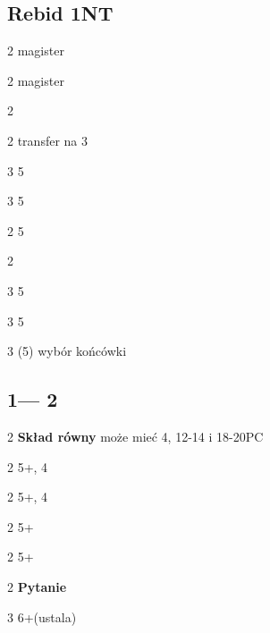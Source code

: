 \documentclass[12pt, a4paper]{article}
\begin{document}
\subsection*{Rebid 1NT}
\begin{options}[2]
    \item[2\clubs] magister
    \item[2\diams] magister
    \item[2\hearts] \soff
    \item[2\nt] transfer na 3\clubs \vimp
    \item[3\clubs] 5\clubs\ \gf \imp
    \item[3\diams] 5\diams\ \gf \imp
\end{options}

\begin{options}[2]
    \item[2\hearts] 5\hearts\ \inv
    \item[2\nt] \bal\ \inv 
    \item[3\clubs] 5\clubs\ \inv
    \item[3\diams] 5\diams\ \inv
    \item[3\nt] (5) wybór końcówki \vimp
\end{options}

\pagebreak
\subsection*{1\clubs --- 2\clubs}
\sequence{{1\clubs}{2\clubs}}
\begin{options}[1]
    \item[2\diams] \textbf{Skład równy} może mieć 4\major, 12-14 i 18-20PC \vimp
    \item[2\hearts] 5+\clubs, 4\hearts
    \item[2\spades] 5+\clubs, 4\spades  
\end{options}

\sequence{{1\clubs}{2\clubs}{2\diams}}
\begin{options}[2]
    \item[2\hearts] 5+\hearts
    \item[2\spades] 5+\spades
    \item[2\nt] \textbf{Pytanie}  
    \item[3\clubs] 6+\clubs (ustala) 
\end{options}
\end{document}
